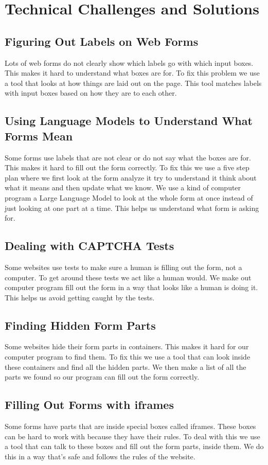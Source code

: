 \documentclass[conference]{IEEEtran}
\begin{document}
\section{Technical Challenges and Solutions}

\subsection{Figuring Out Labels on Web Forms}
Lots of web forms do not clearly show which labels go with which input boxes. This makes it hard to understand what boxes are for. To fix this problem we use a tool that looks at how things are laid out on the page. This tool matches labels with input boxes based on how they are to each other.

\subsection{Using Language Models to Understand What Forms Mean}
Some forms use labels that are not clear or do not say what the boxes are for. This makes it hard to fill out the form correctly. To fix this we use a five step plan where we first look at the form analyze it try to understand it think about what it means and then update what we know. We use a kind of computer program a Large Language Model to look at the whole form at once instead of just looking at one part at a time. This helps us understand what form is asking for.

\subsection{Dealing with CAPTCHA Tests}
Some websites use tests to make sure a human is filling out the form, not a computer. To get around these tests we act like a human would. We make out computer program fill out the form in a way that looks like a human is doing it. This helps us avoid getting caught by the tests.

\subsection{Finding Hidden Form Parts}
Some websites hide their form parts in containers. This makes it hard for our computer program to find them. To fix this we use a tool that can look inside these containers and find all the hidden parts. We then make a list of all the parts we found so our program can fill out the form correctly.

\subsection{Filling Out Forms with iframes}
Some forms have parts that are inside special boxes called iframes. These boxes can be hard to work with because they have their rules. To deal with this we use a tool that can talk to these boxes and fill out the form parts, inside them. We do this in a way that's safe and follows the rules of the website.
\end{document}
